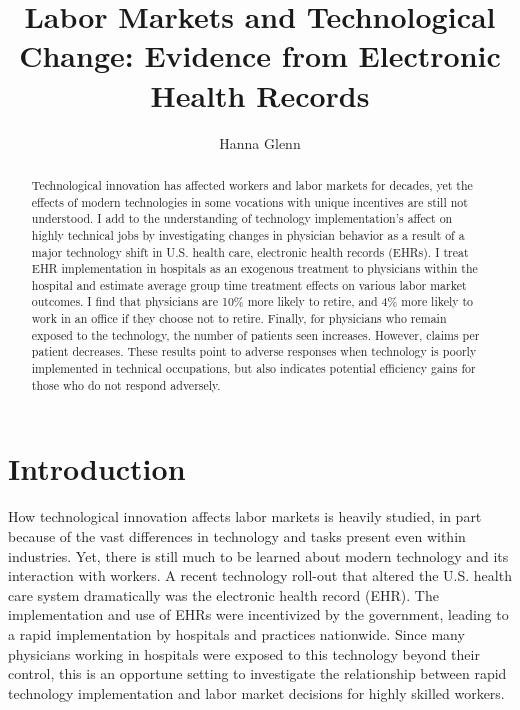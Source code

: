 \documentclass[12pt]{article}
\title{Labor Markets and Technological Change: Evidence from Electronic Health Records}
\author{Hanna Glenn}
\begin{document}
\maketitle

\begin{abstract}
    Technological innovation has affected workers and labor markets for decades, yet the effects of modern technologies in some vocations with unique incentives are still not understood. I add to the understanding of technology implementation's affect on highly technical jobs by investigating changes in physician behavior as a result of a major technology shift in U.S. health care, electronic health records (EHRs). I treat EHR implementation in hospitals as an exogenous treatment to physicians within the hospital and estimate average group time treatment effects on various labor market outcomes. I find that physicians are 10\% more likely to retire, and 4\% more likely to work in an office if they choose not to retire. Finally, for physicians who remain exposed to the technology, the number of patients seen increases. However, claims per patient decreases. These results point to adverse responses when technology is poorly implemented in technical occupations, but also indicates potential efficiency gains for those who do not respond adversely. 
\end{abstract}

\vspace{1.5cm}

\section{Introduction}
How technological innovation affects labor markets is heavily studied, in part because of the vast differences in technology and tasks present even within industries. Yet, there is still much to be learned about modern technology and its interaction with workers. A recent technology roll-out that altered the U.S. health care system dramatically was the electronic health record (EHR). The implementation and use of EHRs were incentivized by the government, leading to a rapid implementation by hospitals and practices nationwide. Since many physicians working in hospitals were exposed to this technology beyond their control, this is an opportune setting to investigate the relationship between rapid technology implementation and labor market decisions for highly skilled workers. 
\end{document}
